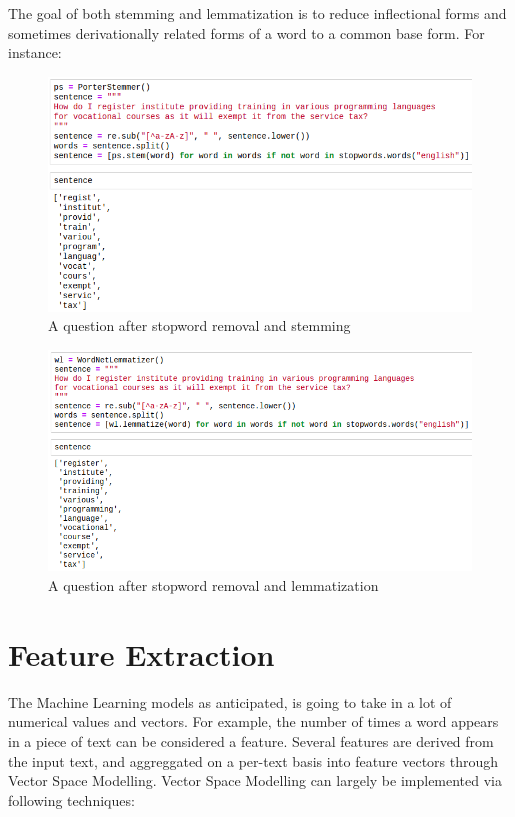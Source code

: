 The goal of both stemming and lemmatization is to reduce inflectional forms and sometimes derivationally related forms of a word to a common base form. For instance:

\begin{figure}[tbh]
\begin{center}
	\includegraphics[width = 5.5in]{images/stem.png}
	\caption{A question after stopword removal and stemming}
	\label{stopwords}
\end{center}
\end{figure}
\newpage
\begin{figure}[tbh]
\begin{center}
	\includegraphics[width = 5.5in]{images/lemma.png}
	\caption{A question after stopword removal and lemmatization}
	\label{stopwords}
\end{center}
\end{figure}


\section{Feature Extraction}
The Machine Learning models as anticipated, is going to take in a lot of numerical values and vectors. For example, the number of times a word appears in a piece of text can be considered a feature. Several features are derived from the input text, and aggreggated on a per-text basis into feature vectors through Vector Space Modelling. Vector Space Modelling can largely be implemented via following techniques:

